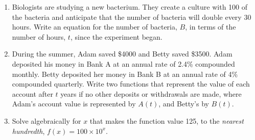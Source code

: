 \documentclass[12pt, twoside]{article}
\begin{document}
\begin{enumerate}[itemsep=0.5cm]
\newpage
\item Biologists are studying a new bacterium. They create a culture with 100 of the bacteria and
anticipate that the number of bacteria will double every 30 hours. Write an equation for the
number of bacteria, $B$, in terms of the number of hours, $t$, since the experiment began. %
\vspace{3cm}

\item During the summer, Adam saved \$4000 and Betty saved \$3500. Adam deposited his money in
Bank A at an annual rate of 2.4\% compounded monthly. Betty deposited her money in Bank B at
an annual rate of 4\% compounded quarterly. Write two functions that represent the value of each
account after $t$ years if no other deposits or withdrawals are made, where Adam's account value is represented by $A(t)$, and Betty's by $B(t)$. \vspace{5cm}

\item Solve algebraically for $x$ that makes the function value 125, to the \emph{nearest hundredth}, $f(x)=100 \times 10^{x}$. 

\end{enumerate}
\end{document}
